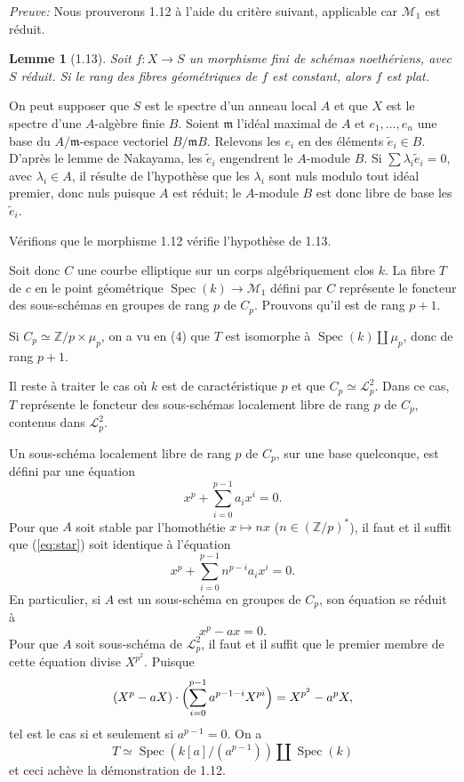 \documentclass[11pt,a4paper]{amsart}
\theoremstyle{plain}
\newtheorem{lemma}[theorem]{Lemme}
\theoremstyle{definition}
\DeclareMathOperator{\Spec}{Spec}
\newcommand{\CL}{\mathcal{L}}
\newcommand{\mll}{\mathcal{M}}
\newcommand{\ZZ}{\mathbb{Z}}
\newcommand{\mg}{\mathfrak{m}}
\begin{document}
\noindent\textit{Preuve:} Nous prouverons 1.12 \`a l'aide du crit\`ere suivant, applicable car $\mll_1$ est r\'eduit.

\begin{lemma}[1.13]
Soit $f \colon X \to S$ un morphisme fini de sch\'emas noeth\'eriens, avec $S$ r\'eduit. Si le rang des fibres g\'eom\'etriques de $f$ est constant, alors $f$ est plat.
\end{lemma}

On peut supposer que $S$ est le spectre d'un anneau local $A$ et que $X$ est le spectre d'une $A$-alg\`ebre finie $B$. Soient $\mg$ l'id\'eal maximal de $A$ et $e_1, \ldots, e_n$ une base du $A/\mg$-espace vectoriel $B/\mg B$. Relevons les $e_i$ en des \'el\'ements $\tilde{e}_i \in B$. D'apr\`es le lemme de Nakayama, les $\tilde{e}_i$ engendrent le $A$-module $B$. Si $\sum \lambda_i \tilde{e}_i = 0$, avec $\lambda_i \in A$, il r\'esulte de l'hypoth\`ese que les $\lambda_i$ sont nuls modulo tout id\'eal premier, donc nuls puisque $A$ est r\'eduit; le $A$-module $B$ est donc libre de base les $\tilde{e}_i$.

V\'erifions que le morphisme 1.12 v\'erifie l'hypoth\`ese de 1.13.

Soit donc $C$ une courbe elliptique sur un corps alg\'ebriquement clos $k$. La fibre $T$ de $c$ en le point g\'eom\'etrique $\Spec(k) \to \mll_1$ d\'efini par $C$ repr\'esente le foncteur des sous-sch\'emas en groupes de rang $p$ de $C_p$. Prouvons qu'il est de rang $p+1$.

Si $C_p \simeq \ZZ/p \times \mu_p$, on a vu en (4) que $T$ est isomorphe \`a $\Spec(k) \amalg \mu_p$, donc de rang $p+1$.

Il reste \`a traiter le cas o\`u $k$ est de caract\'eristique $p$ et que $C_p \simeq \CL_p^2$. Dans ce cas, $T$ repr\'esente le foncteur des sous-sch\'emas localement libre de rang $p$ de $C_p$, contenus dans $\CL_p^2$.

Un sous-sch\'ema localement libre de rang $p$ de $C_p$, sur une base quelconque, est d\'efini par une \'equation
\begin{equation}\label{eq:star}
x^p + \sum_{i=0}^{p-1} a_i x^i = 0.
\end{equation}
Pour que $A$ soit stable par l'homoth\'etie $x \mapsto nx$ ($n \in (\ZZ/p)^*$), il faut et il suffit que (\ref{eq:star}) soit identique \`a l'\'equation
\[
x^p + \sum_{i=0}^{p-1} n^{p-i} a_i x^i = 0.
\]
En particulier, si $A$ est un sous-sch\'ema en groupes de $C_p$, son \'equation se r\'eduit \`a
\[
x^p - a x = 0.
\]
Pour que $A$ soit sous-sch\'ema de $\CL_p^2$, il faut et il suffit que le premier membre de cette \'equation divise $X^{p^2}$. Puisque
\[
(X^p - aX) \cdot \Bigl(\sum_{i=0}^{p-1} a^{p-1-i} X^{pi}\Bigr) = X^{p^2} - a^p X,
\]
tel est le cas si et seulement si $a^{p-1} = 0$. On a
\[
T \simeq \Spec(k[a]/(a^{p-1})) \amalg \Spec(k)
\]
et ceci ach\`eve la d\'emonstration de 1.12.
\end{document}
